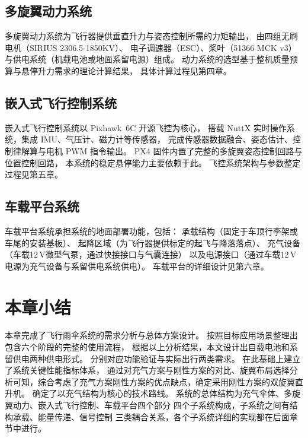 \subsection{多旋翼动力系统}

多旋翼动力系统为飞行器提供垂直升力与姿态控制所需的力矩输出，
由四组无刷电机（SIRIUS 2306.5-1850KV）、
电子调速器（ESC）、桨叶（51366 MCK v3）
与供电系统（机载电池或地面系留电源）组成。
动力系统的选型基于整机质量预算与悬停升力需求的理论计算结果，
具体计算过程见第四章。

\subsection{嵌入式飞行控制系统}

嵌入式飞行控制系统以 Pixhawk~6C 开源飞控为核心，
搭载 NuttX 实时操作系统，集成 IMU、气压计、磁力计等传感器，
完成传感器数据融合、姿态估计、控制律解算与电机 PWM 指令输出。
PX4 固件内置了完整的多旋翼姿态控制回路与位置控制回路，
本系统的稳定悬停能力主要依赖于此。
飞控系统架构与参数整定过程见第五章。

\subsection{车载平台系统}

车载平台系统承担系统的地面部署功能，包括：
承载结构（固定于车顶行李架或车尾的安装基板）、
起降区域（为飞行器提供标定的起飞与降落落点）、
充气设备（车载12\,V微型气泵，通过快接接口与气囊连接）
以及电源接口（通过车载12\,V电源为充气设备与系留供电系统供电）。
车载平台的详细设计见第六章。

\section{本章小结}

本章完成了飞行雨伞系统的需求分析与总体方案设计。
按照目标应用场景整理出包含六个阶段的完整的使用流程，
根据以上分析结果，本文设计出自载电池和系留供电两种供电形式。
分别对应功能验证与实际出行两类需求。
在此基础上建立了系统关键性能指标体系，
通过对充气方案与刚性方案的对比、旋翼布局选择分析可知，综合考虑了充气方案刚性方案的优点缺点，确定采用刚性方案的双旋翼直升机。
确定了以充气结构为核心的技术路线。
系统的总体结构为充气伞体、多旋翼动力、嵌入式飞行控制、车载平台四个部分
四个子系统构成，子系统之间有结构承载、能量传递、信号控制
三类耦合关系，各个子系统详细的实现都在后面章节中进行。